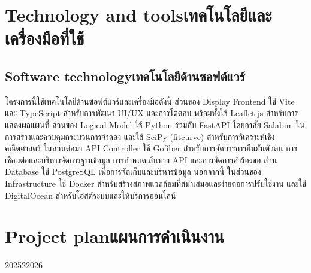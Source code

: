 \section{\ifenglish Technology and tools\else เทคโนโลยีและเครื่องมือที่ใช้\fi}

\subsection{\ifenglish Software technology\else เทคโนโลยีด้านซอฟต์แวร์\fi}
    \begin{mypara}
        \indent โครงการนี้ใช้เทคโนโลยีด้านซอฟต์แวร์และเครื่องมือดังนี้ ส่วนของ Display Frontend ใช้ Vite และ TypeScript 
        สำหรับการพัฒนา UI/UX และการโต้ตอบ พร้อมทั้งใช้ Leaflet.js สำหรับการแสดงผลแผนที่ ส่วนของ Logical Model 
        ใช้ Python ร่วมกับ FastAPI โดยอาศัย Salabim ในการสร้างและควบคุมกระบวนการจำลอง และใช้ SciPy (fitcurve) 
        สำหรับการวิเคราะห์เชิงคณิตศาสตร์ ในส่วนต่อมา API Controller ใช้ Gofiber สำหรับการจัดการการยืนยันตัวตน 
        การเชื่อมต่อและบริหารจัดการฐานข้อมูล การกำหนดเส้นทาง API และการจัดการคำร้องขอ 
        ส่วน Database ใช้ PostgreSQL เพื่อการจัดเก็บและบริหารข้อมูล นอกจากนี้ ในส่วนของ 
        Infrastructure ใช้ Docker สำหรับสร้างสภาพแวดล้อมที่สม่ำเสมอและง่ายต่อการปรับใช้งาน และใช้ DigitalOcean 
        สำหรับโฮสต์ระบบและให้บริการออนไลน์
    \end{mypara}


\section{\ifenglish Project plan\else แผนการดำเนินงาน\fi}

\begin{plan}{6}{2025}{2}{2026}
\end{plan}

